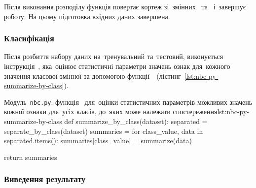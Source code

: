 \documentclass[
	a4paper,
	oneside,
	DIV = 12,
	fontsize = 13pt,
	headings = normal,
	numbers = endperiod,
]{scrartcl}
\theoremstyle{mythm}
\newcommand{\filename}[1]{\texttt{#1}}
\begin{document}
					Після виконання розподілу функція повертає кортеж зі~змінних~ та~ і~завершує роботу. На цьому підготовка вхідних даних завершена.

				\subsubsection{Класифікація}

					Після розбиття набору даних на~тренувальний та~тестовий, виконується інструкція~, яка~оцінює статистичні параметри значень ознак для~кожного значення класової змінної за допомогою функції~~(лістинг~\ref{lst:nbc-py-summarize-by-class}).

				\begin{listingpython}{Модуль~\filename{nbc.py}: функція~ для~оцінки статистичних параметрів можливих значень кожної ознаки для~усіх класів, до~яких може належати спостереження}{lst:nbc-py-summarize-by-class}
def summarize_by_class(dataset):
    separated = separate_by_class(dataset)
    summaries = {}
    for class_value, data in separated.items():
        summaries[class_value] = summarize(data)

    return summaries
					\end{listingpython}

				\subsubsection{Виведення результату}

	\newpage

	\newpage
	\printbibliography
\end{document}
